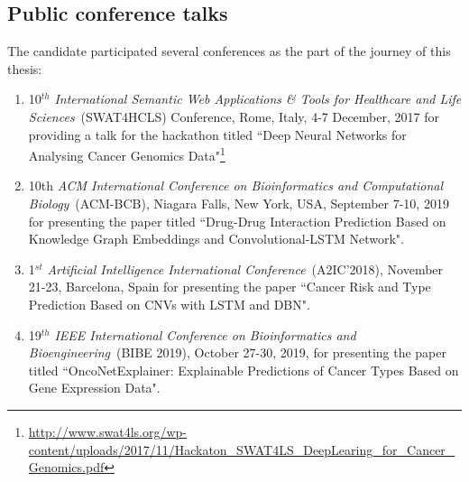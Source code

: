 
\subsection{Public conference talks}
The candidate participated several conferences as the part of the journey of this thesis: 
\begin{enumerate}[noitemsep]
    \item 10$^{th}$ \textit{International Semantic Web Applications \& Tools for Healthcare and Life Sciences}~(SWAT4HCLS) Conference, Rome, Italy, 4-7 December, 2017 for providing a talk for the hackathon titled ``Deep Neural Networks for Analysing Cancer Genomics Data"\footnote{\url{http://www.swat4ls.org/wp-content/uploads/2017/11/Hackaton_SWAT4LS_DeepLearing_for_Cancer_Genomics.pdf}}
	\item 10th \textit{ACM International Conference on Bioinformatics and Computational Biology}~(ACM-BCB), Niagara Falls, New York, USA, September 7-10, 2019 for presenting the paper titled ``Drug-Drug Interaction Prediction Based on Knowledge Graph Embeddings and Convolutional-LSTM Network".
	\item 1$^{st}$ \textit{Artificial Intelligence International Conference}~(A2IC'2018), November 21-23, Barcelona, Spain for presenting the paper ``Cancer Risk and Type Prediction Based on CNVs with LSTM and DBN". 
	\item 19$^{th}$ \textit{IEEE International Conference on Bioinformatics and Bioengineering}~(BIBE 2019), October 27-30, 2019, for presenting the paper titled ``OncoNetExplainer: Explainable Predictions of Cancer Types Based on Gene Expression Data".
\end{enumerate}

